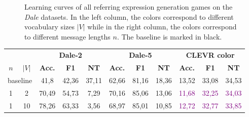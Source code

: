 \begin{figure}[ht!]
{        \label{fig:learning-curve_re-generator_dale-5_max-len}
    }
    \caption{Learning curves of all referring expression generation games on the \emph{Dale} datasets. In the left column, the colors correspond to different vocabulary sizes $|V|$ while in the right column, the colors correspond to different message lengths $n$. The baseline is marked in black.}
    \label{fig:learning-curves_re-generator}
\end{figure}

\begin{table}[ht]
    \centering
    \begin{tabular}{cc|ccc|ccc|ccc}
        \toprule
                                      &        & \multicolumn{3}{c}{\textbf{Dale-2}} & \multicolumn{3}{c}{\textbf{Dale-5}} & \multicolumn{3}{c}{\textbf{CLEVR color}}                                                                                                                                                                         \\  \cmidrule(lr){3-5}\cmidrule(lr){6-8}\cmidrule(lr){9-11}
        $n$                           & $|V|$  & \textbf{Acc.}                       & \textbf{F1}                         & \textbf{NT}                              & \textbf{Acc.}             & \textbf{F1}               & \textbf{NT}               & \textbf{Acc.}             & \textbf{F1}               & \textbf{NT}               \\\midrule
        \multicolumn{2}{c|}{baseline} & {41,8} & {42,36}                             & {37,11}                             & {62,66}                                  & {81,16}                   & {18,36}                   & {13,52}                   & {33,08}                   & {34,53}                                               \\\midrule
        {1}                           & {2}    & {70,49}                             & {54,73}                             & {7,29}                                   & {70,16}                   & {85,06}                   & {13,06}                   & \textcolor{purple}{11,68} & \textcolor{purple}{32,25} & \textcolor{purple}{34,03} \\
        {1}                           & {10}   & {78,26}                             & {63,33}                             & {3,56}                                   & {68,97}                   & {85,01}                   & {10,85}                   & \textcolor{purple}{12,72} & \textcolor{purple}{32,77} & \textcolor{purple}{33,85} \\

\end{tabular}
\end{table}
